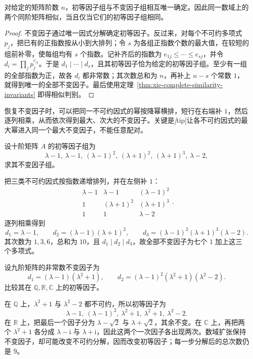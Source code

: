 \begin{theorem}
\label{thm:xie-elementary-complete}
对给定的矩阵阶数 $n$，初等因子组与不变因子组相互唯一确定。因此同一数域上的两个同阶矩阵相似，当且仅当它们的初等因子组相同。
\end{theorem}
\begin{proof}
不变因子通过唯一因式分解确定初等因子。反过来，对每个不可约多项式 $p_j$，把已有的正指数按从小到大排列；令 $s$ 为各组正指数个数的最大值，在较短的组前补零，使每组均有 $s$ 个指数。记补齐后的指数为 $e_{1j}\le\cdots\le e_{sj}$，并令 $d_i=\prod_jp_j^{e_{ij}}$。于是 $d_1\mid\cdots\mid d_s$，且其初等因子恰为给定的初等因子组。至少有一组的全部指数为正，故各 $d_i$ 都非常数；其次数总和为 $n$，再补上 $n-s$ 个常数 $1$，就得到唯一的全部不变因子。最后使用定理~\ref{thm:xie-complete-similarity-invariants} 即得相似判别。
\end{proof}

恢复不变因子时，可以把同一不可约因式的幂按降幂横排，短行在右端补 $1$，然后逐列相乘，从而依次得到最大、次大的不变因子。关键是\emph[tip]{让各不可约因式的最大幂进入同一个最大不变因子}，不能任意配对。

\begin{example}
\label{ex:xie-elementary-reassemble}
设十阶矩阵 $A$ 的初等因子组为
\[
    \lambda-1,\ \lambda-1,\ (\lambda-1)^2,
    \ (\lambda+1)^2,\ (\lambda+1)^3,\ \lambda-2,
\]
求其不变因子组。
\end{example}
\begin{solve}
把三类不可约因式按指数递增排列，并在左侧补 $1$：
\[
    \begin{array}{ccc}
        \lambda-1&\lambda-1&(\lambda-1)^2\\
        1&(\lambda+1)^2&(\lambda+1)^3\\
        1&1&\lambda-2
    \end{array}.
\]
逐列相乘得到
\[
    d_1=\lambda-1,\qquad
    d_2=(\lambda-1)(\lambda+1)^2,\qquad
    d_3=(\lambda-1)^2(\lambda+1)^3(\lambda-2).
\]
其次数为 $1,3,6$，总和为 $10$，且 $d_1\mid d_2\mid d_3$，故全部不变因子为七个 $1$ 加上这三个多项式。
\end{solve}

\begin{example}
\label{ex:xie-elementary-fields}
设九阶矩阵的非常数不变因子为
\[
    d_1=(\lambda-1)(\lambda^2+1),\qquad
    d_2=(\lambda-1)^2(\lambda^2+1)(\lambda^2-2).
\]
比较其在 $\mathbb Q,\mathbb R,\mathbb C$ 上的初等因子。
\end{example}
\begin{solve}
在 $\mathbb Q$ 上，$\lambda^2+1$ 与 $\lambda^2-2$ 都不可约，所以初等因子为
\[
    \lambda-1,\ (\lambda-1)^2,\ \lambda^2+1,\ \lambda^2+1,\ \lambda^2-2.
\]
在 $\mathbb R$ 上，把最后一个因子分为 $\lambda-\sqrt2$ 与 $\lambda+\sqrt2$，其余不变。在 $\mathbb C$ 上，再把两个 $\lambda^2+1$ 各分成 $\lambda-\mathrm i$ 与 $\lambda+\mathrm i$，因此这两个一次因子各出现两次。数域扩张保持不变因子，却可能改变不可约分解，因而改变初等因子；每一步分解后的总次数仍是 $9$。
\end{solve}

